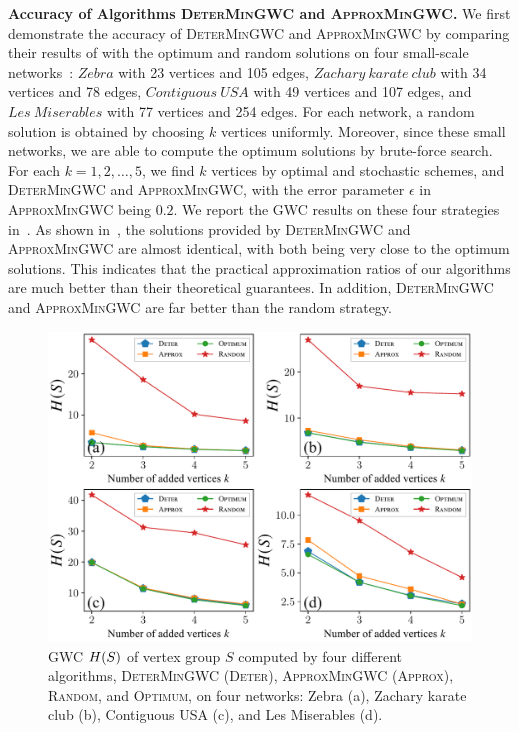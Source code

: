 \documentclass[10pt,twocolumn,twoside]{IEEEtran}
\begin{document}
\textbf{Accuracy of Algorithms \textsc{DeterMinGWC} and \textsc{ApproxMinGWC}.} We first demonstrate the accuracy of \textsc{DeterMinGWC} and \textsc{ApproxMinGWC} by comparing their results of with the optimum and random solutions on four small-scale networks~\cite{Ku13}: \(\mathit{Zebra}\) with 23 vertices and 105 edges, \(\mathit{Zachary\ karate\ club}\) with 34 vertices and 78 edges, \(\mathit{Contiguous\ USA}\) with 49 vertices and 107 edges, and \(\mathit{Les\ Miserables}\) with 77 vertices and 254 edges. For each network, a random solution is obtained by choosing $k$ vertices uniformly. Moreover, since these small networks, we are able to compute the optimum solutions by brute-force search. For each $k=1,2,\ldots,5$, we find $k$ vertices  by optimal and stochastic schemes, and \textsc{DeterMinGWC} and \textsc{ApproxMinGWC}, with the error parameter $\epsilon$ in \textsc{ApproxMinGWC} being  \(0.2\). We report the GWC results on these four strategies in~. As shown in~,  the solutions provided by \textsc{DeterMinGWC} and \textsc{ApproxMinGWC} are almost identical, with both being very close to the optimum solutions. This indicates that the practical approximation ratios of our algorithms are much better than their theoretical guarantees. In addition,  \textsc{DeterMinGWC} and \textsc{ApproxMinGWC} are far better than the random strategy.



\begin{figure}[!t]
    \centering
    \includegraphics[width=\linewidth]{compare_effects_optimum.pdf}
    \caption{GWC \(H(S)\) of vertex group \(S\) computed by four different algorithms, \textsc{DeterMinGWC} (\textsc{Deter}), \textsc{ApproxMinGWC} (\textsc{Approx}), \textsc{Random}, and \textsc{Optimum}, on four networks: Zebra (a), Zachary karate club (b), Contiguous USA (c), and Les Miserables (d).\label{pic:compare-effect-optimum}}
\end{figure}
\end{document}
